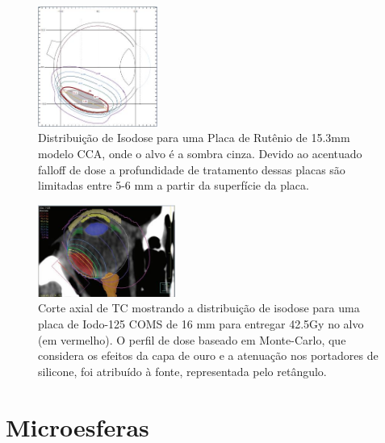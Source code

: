 \documentclass[11pt,a4paper]{article}
\begin{document}
   
    \begin{figure}[h]
        \centering
        \includegraphics[width=0.35\textwidth]{Imagens/distribDosePlacaOftamRutenio.JPG}
        \caption{Distribuição de Isodose para uma Placa de Rutênio de 15.3mm modelo CCA, onde o alvo é a sombra cinza. Devido ao acentuado falloff de dose a profundidade de tratamento dessas placas são limitadas entre 5-6 mm a partir da superfície da placa.}
    \end{figure}
 

    \begin{figure}[h]
        \centering
        \includegraphics[width=0.4\textwidth]{Imagens/distribDosePlacaComsI125.JPG}
        \caption{Corte axial de TC mostrando a distribuição de isodose para uma placa de Iodo-125 COMS de 16 mm para entregar 42.5Gy no alvo (em vermelho). O perfil de dose baseado em Monte-Carlo, que considera os efeitos da capa de ouro e a atenuação nos portadores de silicone, foi atribuído à fonte, representada pelo retângulo.}
    \end{figure}


\section{Microesferas}
\end{document}

